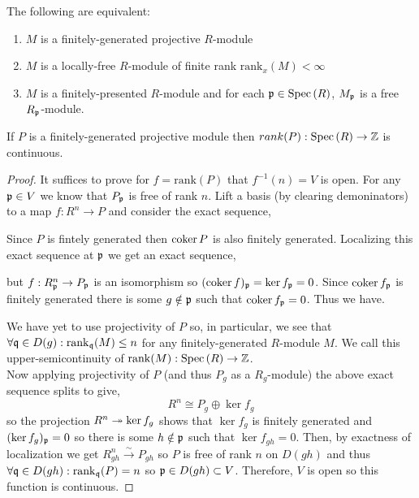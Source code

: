 \documentclass[12pt]{extarticle}
\newcommand{\rank}{\mathrm{rank}}
\begin{document}
\begin{theorem}
The following are equivalent:
\begin{enumerate}
\item $M$ is a finitely-generated projective $R$-module
\item $M$ is a locally-free $R$-module of finite rank $\rank_x(M) < \infty$
\item $M$ is a finitely-presented $R$-module and for each $\mathfrak{p} \in \mathrm{Spec}\left( R \right)$, $M_{\mathfrak{p}}$ is a free $R_{\mathfrak{p}}$-module. 
\end{enumerate}
\end{theorem}

\begin{proposition}
If $P$ is a finitely-generated projective module then $rank(P) : \mathrm{Spec}\left( R \right) \to \mathbb{Z}$ is continuous.
\end{proposition}

\begin{proof}
It suffices to prove for $f = \rank(P)$ that $f^{-1}(n) = V$ is open. For any $\mathfrak{p} \in V$ we know that $P_{\mathfrak{p}}$ is free of rank $n$. Lift a basis (by clearing demoninators) to a map $f : R^n \to P$ and consider the exact sequence,
\begin{center}
\end{center}  
Since $P$ is fintely generated then $\operatorname{\mathrm{coker}}{P}$ is also finitely generated. Localizing this exact sequence at $\mathfrak{p}$ we get an exact sequence,
\begin{center}
\end{center}
but $f : R^n_{\mathfrak{p}} \to P_{\mathfrak{p}}$ is an isomorphism so $(\operatorname{\mathrm{coker}}{f})_{\mathfrak{p}} = \ker{f}_{\mathfrak{p}} = 0$. Since $\operatorname{\mathrm{coker}}{f}_{\mathfrak{p}}$ is finitely generated there is some $g \notin \mathfrak{p}$ such that $\operatorname{\mathrm{coker}}{f}_{\mathfrak{p}} = 0$. Thus we have.
\begin{center}
\end{center}
We have yet to use projectivity of $P$ so,
in particular, we see that $\forall \q \in D(g) : \rank_\q(M) \le n$ for any finitely-generated $R$-module $M$. We call this upper-semicontinuity of $\rank(M) : \Spec{R} \to \Z$.
\bigskip\\
Now applying projectivity of $P$ (and thus $P_g$ as a $R_g$-module) the above exact sequence splits to give,
\[ R^n \cong P_g \oplus \ker{f}_g \]
so the projection $R^n \twoheadrightarrow \ker{f}_g$ shows that $\ker{f}_g$ is finitely generated and $(\ker{f}_g)_{\mathfrak{p}} = 0$ so there is some $h \notin \mathfrak{p}$ such that $\ker{f}_{gh} = 0$. Then, by exactness of localization we get $R_{gh}^n \xrightarrow{\sim} P_{gh}$ so $P$ is free of rank $n$ on $D(gh)$ and thus $\forall \q \in D(gh) : \rank_\q(P) = n$ so $\mathfrak{p} \in D(gh) \subset V$. Therefore, $V$ is open so this function is continuous.  
\end{proof}
\end{document}
